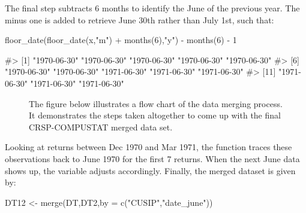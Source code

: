 The final step subtracts 6 months to identify the June of the previous
year. The minus one is added to retrieve June 30th rather than July
1st, such that:
\begin{Schunk}
\begin{Sinput}
floor_date(floor_date(x,"m") + months(6),"y") - months(6) - 1
\end{Sinput}
\begin{Soutput}
#>  [1] "1970-06-30" "1970-06-30" "1970-06-30" "1970-06-30" "1970-06-30"
#>  [6] "1970-06-30" "1970-06-30" "1971-06-30" "1971-06-30" "1971-06-30"
#> [11] "1971-06-30" "1971-06-30" "1971-06-30"
\end{Soutput}
\end{Schunk}


\begin{figure}[!ht]
\begin{center}
\caption{ \color{black} The figure below illustrates a flow chart of the data merging process. It demonstrates the steps taken altogether to come up with the final CRSP-COMPUSTAT merged data set. }
\label{figure:flowchart}
\end{center}
\end{figure}

Looking at returns between Dec 1970 and Mar 1971, the function traces
these observations back to June 1970 for the first 7 returns. When the
next June data shows up, the  variable adjusts
accordingly. Finally, the merged dataset is given by:

\begin{Schunk}
\begin{Sinput}
DT12 <- merge(DT,DT2,by = c("CUSIP","date_june")) 
\end{Sinput}
\end{Schunk}

